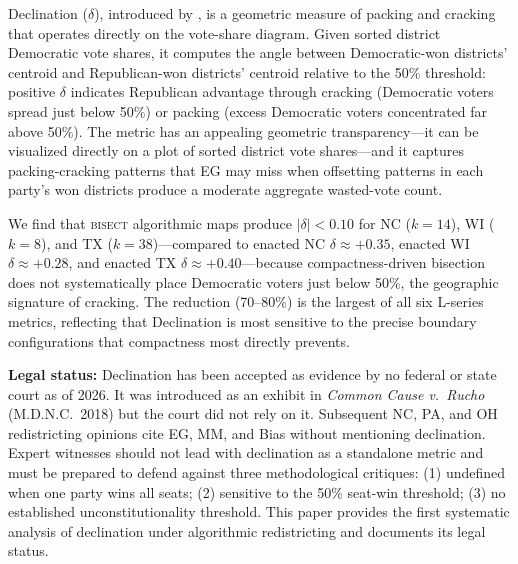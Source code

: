 Declination ($\delta$), introduced by \citet{warrington2018}, is a geometric measure of
packing and cracking that operates directly on the vote-share diagram. Given sorted district
Democratic vote shares, it computes the angle between Democratic-won districts' centroid and
Republican-won districts' centroid relative to the 50\% threshold: positive $\delta$ indicates
Republican advantage through cracking (Democratic voters spread just below 50\%) or packing
(excess Democratic voters concentrated far above 50\%). The metric has an appealing geometric
transparency---it can be visualized directly on a plot of sorted district vote shares---and
it captures packing-cracking patterns that EG may miss when offsetting patterns in each party's
won districts produce a moderate aggregate wasted-vote count.

We find that \textsc{bisect} algorithmic maps produce $|\delta| < 0.10$ for NC ($k=14$),
WI ($k=8$), and TX ($k=38$)---compared to enacted NC $\delta \approx +0.35$, enacted WI
$\delta \approx +0.28$, and enacted TX $\delta \approx +0.40$---because compactness-driven
bisection does not systematically place Democratic voters just below 50\%, the geographic
signature of cracking. The reduction (70--80\%) is the largest of all six L-series metrics,
reflecting that Declination is most sensitive to the precise boundary configurations that
compactness most directly prevents.

\textbf{Legal status:} Declination has been accepted as evidence by no federal or state court
as of 2026. It was introduced as an exhibit in \textit{Common Cause v.\ Rucho} (M.D.N.C.\
2018) but the court did not rely on it. Subsequent NC, PA, and OH redistricting opinions
cite EG, MM, and Bias without mentioning declination. Expert witnesses should not lead with
declination as a standalone metric and must be prepared to defend against three methodological
critiques: (1) undefined when one party wins all seats; (2) sensitive to the 50\% seat-win
threshold; (3) no established unconstitutionality threshold. This paper provides the first
systematic analysis of declination under algorithmic redistricting and documents its legal status.
